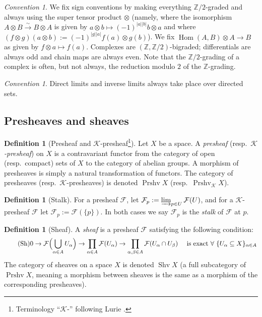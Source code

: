 \documentclass[12pt]{article}
\theoremstyle{definition}
\newtheorem{definition}[theorem]{Definition}
\theoremstyle{remark}
\newtheorem{convention}[theorem]{Convention}
\numberwithin{equation}{subsection}
\newcommand{\F}{\mathcal F}
\newcommand{\K}{\mathcal K}
\newcommand{\ZZ}{\mathbb Z}
\newcommand{\Hom}{\operatorname{Hom}}
\newcommand{\Prshv}{\operatorname{Prshv}}
\newcommand{\Shv}{\operatorname{Shv}}
\begin{document}
\begin{convention}\label{signconventions}
We fix sign conventions by making everything $\ZZ/2$-graded and always using the super tensor product $\otimes$ (namely, where the isomorphism $A\otimes B\xrightarrow\sim B\otimes A$ is given by $a\otimes b\mapsto(-1)^{\left|a\right|\left|b\right|}b\otimes a$ and where $(f\otimes g)(a\otimes b):=(-1)^{\left|g\right|\left|a\right|}f(a)\otimes g(b)$).  We fix $\Hom(A,B)\otimes A\to B$ as given by $f\otimes a\mapsto f(a)$.  Complexes are $(\ZZ,\ZZ/2)$-bigraded; differentials are always odd and chain maps are always even.  Note that the $\ZZ/2$-grading of a complex is often, but not always, the reduction modulo $2$ of the $\ZZ$-grading.
\end{convention}

\begin{convention}
Direct limits and inverse limits always take place over directed sets.
\end{convention}

\subsection{Presheaves and sheaves}\label{sheafintro}

\begin{definition}[Presheaf and $\K$-presheaf\footnote{Terminology ``$\K$-'' following Lurie \cite[Definition 7.3.4.1]{luriehtt}.}]
Let $X$ be a space.  A \emph{presheaf} (resp.\ \emph{$\K$-presheaf}) on $X$ is a contravariant functor from the category of open (resp.\ compact) sets of $X$ to the category of abelian groups.  A morphism of presheaves is simply a natural transformation of functors.  The category of presheaves (resp.\ $\K$-presheaves) is denoted $\Prshv X$ (resp.\ $\Prshv_\K X$).
\end{definition}

\begin{definition}[Stalk]
For a presheaf $\F$, let $\F_p:=\varinjlim_{p\in U}\F(U)$, and for a $\K$-presheaf $\F$ let $\F_p:=\F(\{p\})$.  In both cases we say $\F_p$ is the \emph{stalk} of $\F$ at $p$.
\end{definition}

\begin{definition}[Sheaf]
A \emph{sheaf} is a presheaf $\F$ satisfying the following condition:
\begin{equation*}
\tag{Sh}\label{opensheafproperty}0\to\F\Bigl(\bigcup_{\alpha\in A}U_\alpha\Bigr)\to\prod_{\alpha\in A}\F(U_\alpha)\to\prod_{\alpha,\beta\in A}\F(U_\alpha\cap U_\beta)\quad\text{ is exact }\forall\text{ }\{U_\alpha\subseteq X\}_{\alpha\in A}
\end{equation*}
The category of sheaves on a space $X$ is denoted $\Shv X$ (a full subcategory of $\Prshv X$, meaning a morphism between sheaves is the same as a morphism of the corresponding presheaves).
\end{definition}
\end{document}
